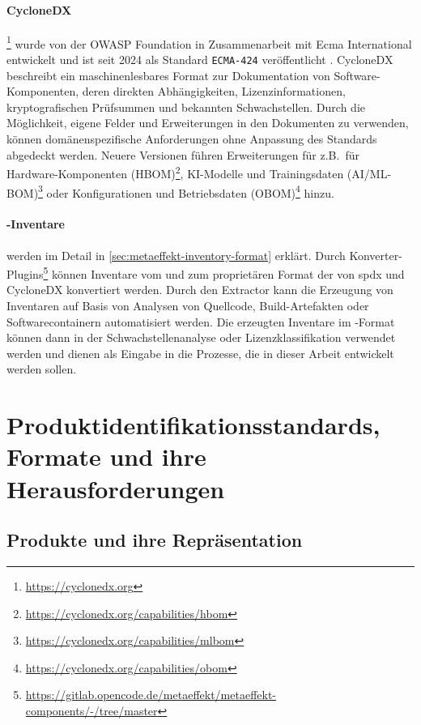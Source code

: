 \paragraph{CycloneDX}\footnote{\url{https://cyclonedx.org}}
wurde von der OWASP Foundation in Zusammenarbeit mit Ecma International entwickelt und ist seit 2024 als Standard \texttt{ECMA-424} veröffentlicht \autocite{CycloneDX2024Spec, ecma424:2024}.
CycloneDX beschreibt ein maschinenlesbares Format zur Dokumentation von Software-Komponenten, deren direkten Abhängigkeiten, Lizenzinformationen, kryptografischen Prüfsummen und bekannten Schwachstellen.
Durch die Möglichkeit, eigene Felder und Erweiterungen in den Dokumenten zu verwenden, können domänenspezifische Anforderungen ohne Anpassung des Standards abgedeckt werden.
Neuere Versionen führen Erweiterungen für z.B.\ für Hardware-Komponenten (HBOM)\footnote{\url{https://cyclonedx.org/capabilities/hbom}}, KI-Modelle und Trainingsdaten (AI/ML-BOM)\footnote{\url{https://cyclonedx.org/capabilities/mlbom}} oder Konfigurationen und Betriebsdaten (OBOM)\footnote{\url{https://cyclonedx.org/capabilities/obom}} hinzu.

\paragraph{\metaeffekt-Inventare}
werden im Detail in \autoref{sec:metaeffekt-inventory-format} erklärt.
Durch Konverter-Plugins\footnote{\url{https://gitlab.opencode.de/metaeffekt/metaeffekt-components/-/tree/master}} können Inventare vom und zum proprietären Format der \metaeffektsp von \acrshort{spdx} und CycloneDX konvertiert werden.
Durch den \metaeffektsp Extractor kann die Erzeugung von Inventaren auf Basis von Analysen von Quellcode, Build-Artefakten oder Softwarecontainern automatisiert werden.
Die erzeugten Inventare im \metaeffekt-Format können dann in der Schwachstellenanalyse oder Lizenzklassifikation verwendet werden und dienen als Eingabe in die Prozesse, die in dieser Arbeit entwickelt werden sollen.


\section{Produktidentifikationsstandards, Formate und ihre Herausforderungen}\label{sec:produktidentifikationsstandards-herausforderungen}

\subsection{Produkte und ihre Repräsentation}

